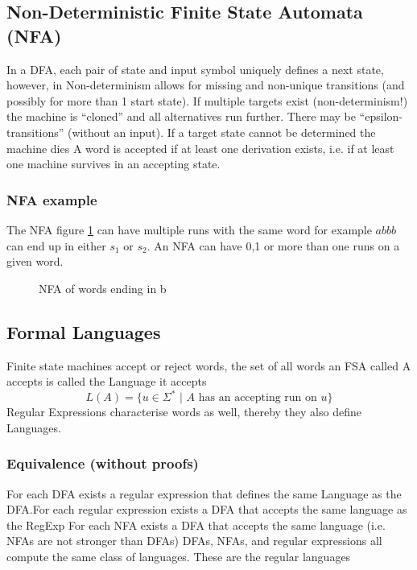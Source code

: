 \subsection{Non-Deterministic Finite State Automata (NFA)}
In a DFA, each pair of state and input symbol uniquely defines a next state, however, in Non-determinism allows for missing and non-unique transitions (and possibly for more than 1 start state). If multiple targets exist (non-determinism!) the machine is “cloned” and all alternatives run further. There may be “epsilon-transitions” (without an input). If a target state cannot be determined the machine dies
A word is accepted if at least one derivation exists, i.e. if at least
one machine survives in an accepting state.
\subsubsection{NFA example}
The NFA figure \ref{fig:NFA*} can have multiple runs with the same word for example $abbb$ can end up in either $s_1$ or $s_2$. An NFA can have 0,1 or more than one runs on a given word.
\begin{figure}[H]
    \centering
    \caption{NFA of words ending in b}
    \label{fig:NFA*}
\end{figure}
\subsection{Formal Languages}
Finite state machines accept or reject words, the set of all words an FSA called A accepts is called the Language it accepts 
\begin{equation}
    L(A) = \{u \in \Sigma^* \,\,|\,\, A \text{ has an accepting run on }u\}
\end{equation}
Regular Expressions characterise words as well, thereby they also define Languages.
\subsubsection{Equivalence (without proofs)}
For each DFA exists a regular expression that defines the same Language as the DFA.For each regular expression exists a DFA that accepts the same language as the RegExp For each NFA exists a DFA that accepts the same language (i.e. NFAs are not stronger than DFAs) DFAs, NFAs, and regular expressions all compute the same class of languages. These are the regular languages
